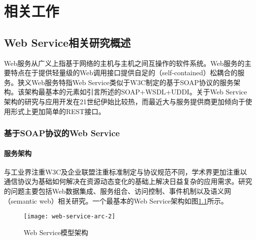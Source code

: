 

\chapter{相关工作}
\section{Web Service相关研究概述}
Web服务从广义上指基于网络的主机与主机之间互操作的软件系统。Web服务的主要特点在于提供轻量级的Web调用接口提供自足的（self-contained）松耦合的服务。狭义Web服务特指Web Service类似于W3C制定的基于SOAP协议的服务架构。该架构最基本的元素如引言所述的SOAP+WSDL+UDDI。关于Web Service架构的研究与应用开发在21世纪伊始比较热，而最近大与服务提供商更加倾向于使用形式上更加简单的REST接口。
\subsection{基于SOAP协议的Web Service}
\subsubsection{服务架构}
\label{WSMF-arc}
与工业界注重W3C及企业联盟注重标准制定与协议规范不同，学术界更加注重以通信协议为基础如何解决在资源动态变化的基础上解决日益复杂的应用需求。研究的问题主要包括Web数据集成、服务组合、访问控制、事件机制以及语义网（semantic web）相关研究。一个最基本的Web Service架构如图\ref{fig:web-service-arc-2}所示。

\begin{figure}[H]
  \centering
  \texttt{[image: web-service-arc-2]}
  \caption{Web Service模型架构}
  \label{fig:web-service-arc-2}
\end{figure}

